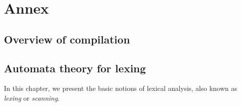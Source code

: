 \part{Annex}
\label{part:annex}

\chapter{Overview of compilation}



\chapter{Automata theory for lexing}

In this chapter, we present the basic notions of lexical analysis,
also known as \emph{lexing} or \emph{scanning}.










